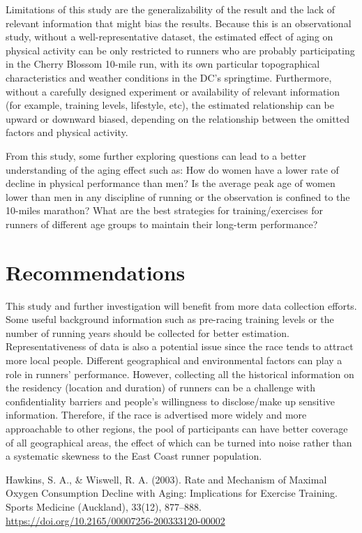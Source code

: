 \documentclass[12pt]{article}
\begin{document}
Limitations of this study are the generalizability of the result and the lack of relevant information that might bias the results. Because this is an observational study, without a well-representative dataset, the estimated effect of aging on physical activity can be only restricted to runners who are probably participating in the Cherry Blossom 10-mile run, with its own particular topographical characteristics and weather conditions in the DC’s springtime. Furthermore, without a carefully designed experiment or availability of relevant information (for example, training levels, lifestyle, etc), the estimated relationship can be upward or downward biased, depending on the relationship between the omitted factors and physical activity.

From this study, some further exploring questions can lead to a better understanding of the aging effect such as: How do women have a lower rate of decline in physical performance than men? Is the average peak age of women lower than men in any discipline of running or the observation is confined to the 10-miles marathon? What are the best strategies for training/exercises for runners of different age groups to maintain their long-term performance?

\section*{Recommendations}

This study and further investigation will benefit from more data collection efforts. Some useful background information such as pre-racing training levels or the number of running years should be collected for better estimation. Representativeness of data is also a potential issue since the race tends to attract more local people. Different geographical and environmental factors can play a role in runners’ performance. However, collecting all the historical information on the residency (location and duration) of runners can be a challenge with confidentiality barriers and people’s willingness to disclose/make up sensitive information. Therefore, if the race is advertised more widely and more approachable to other regions, the pool of participants can have better coverage of all geographical areas, the effect of which can be turned into noise rather than a systematic skewness to the East Coast runner population.

\begin{thebibliography}{9}

	Hawkins, S. A., \& Wiswell, R. A. (2003).
	Rate and Mechanism of Maximal Oxygen Consumption Decline with Aging:
	Implications for Exercise Training. Sports Medicine (Auckland), 33(12),
	877--888.
	\\
	\url{https://doi.org/10.2165/00007256-200333120-00002}


\end{thebibliography}
\end{document}
